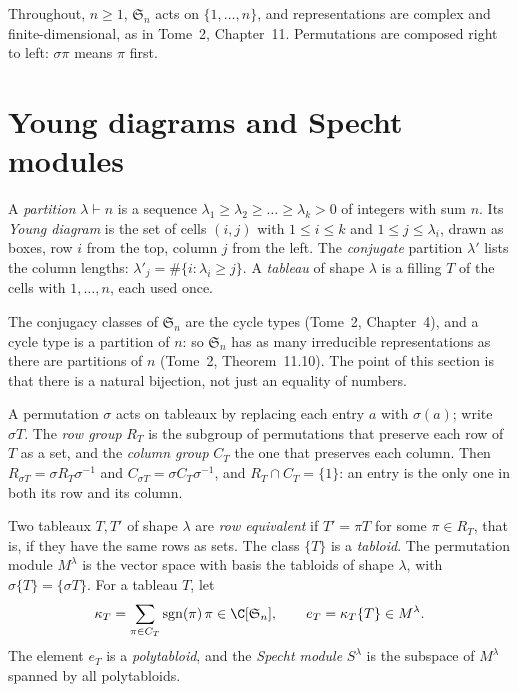 Throughout, $n\ge1$, $\mathfrak S_n$ acts on $\{1,\dots,n\}$, and representations are complex and finite-dimensional, as in Tome~2, Chapter~11. Permutations are composed right to left: $\sigma\pi$ means $\pi$ first.

\section{Young diagrams and Specht modules}

\begin{definition}\label{def:partition}
A \emph{partition} $\lambda\vdash n$ is a sequence $\lambda_1\ge\lambda_2\ge\dots\ge\lambda_k>0$ of integers with sum $n$. Its \emph{Young diagram} is the set of cells $(i,j)$ with $1\le i\le k$ and $1\le j\le\lambda_i$, drawn as boxes, row $i$ from the top,
column $j$ from the left. The \emph{conjugate} partition $\lambda'$ lists the column lengths: $\lambda'_j=\#\{i:\lambda_i\ge j\}$. A \emph{tableau} of shape $\lambda$ is a filling $T$ of the cells with $1,\dots,n$, each used once.
\end{definition}

The conjugacy classes of $\mathfrak S_n$ are the cycle types (Tome~2, Chapter~4), and a cycle type is a partition of $n$: so $\mathfrak S_n$ has as many irreducible representations as there are partitions of $n$ (Tome~2, Theorem~11.10).
The point of this section is that there is a natural bijection, not just an equality of numbers.

A permutation $\sigma$ acts on tableaux by replacing each entry $a$ with $\sigma(a)$; write $\sigma T$. The \emph{row group} $R_T$ is the subgroup of permutations that preserve each row of $T$ as a set, and the \emph{column group}
$C_T$ the one that preserves each column. Then $R_{\sigma T}=\sigma R_T\sigma^{-1}$ and $C_{\sigma T}=\sigma C_T\sigma^{-1}$, and $R_T\cap C_T=\{1\}$: an entry is the only one in both its row and its column.

\begin{definition}\label{def:tabloid}
Two tableaux $T,T'$ of shape $\lambda$ are \emph{row equivalent} if $T'=\pi T$ for some $\pi\in R_T$, that is, if they have the same rows as sets. The class $\{T\}$ is a \emph{tabloid}. The permutation module $M^\lambda$ is the
vector space with basis the tabloids of shape $\lambda$, with $\sigma\{T\}=\{\sigma T\}$. For a tableau $T$, let
\[
\kappa_T=\sum_{\pi\in C_T}\operatorname{sgn}(\pi)\,\pi\in\C[\mathfrak S_n],\qquad e_T=\kappa_T\{T\}\in M^\lambda.
\]
The element $e_T$ is a \emph{polytabloid}, and the \emph{Specht module} $S^\lambda$ is the subspace of $M^\lambda$ spanned by all polytabloids.
\end{definition}

